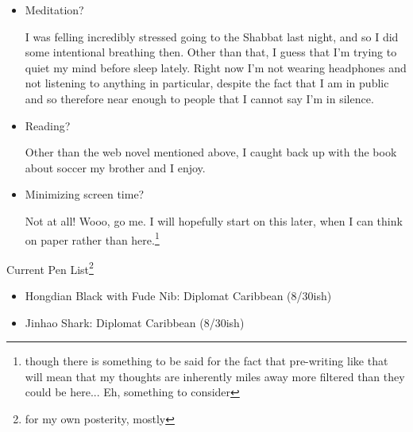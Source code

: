 \documentclass[12pt]{article}
\renewcommand{\,}{\textsuperscript{,}}
\begin{document}
\begin{itemize}
\item Meditation?

I was felling incredibly stressed going to the Shabbat last night, and so I did some intentional breathing then.  
Other than that, I guess that I'm trying to quiet my mind before sleep lately.  
Right now I'm not wearing headphones and not listening to anything in particular, despite the fact that I am in public and so therefore near enough to people that I cannot say I'm in silence.

\item Reading?

Other than the web novel mentioned above, I caught back up with the book about soccer my brother and I enjoy.

\item Minimizing screen time?

Not at all! Wooo, go me. I will hopefully start on this later, when I can think on paper rather than here.\footnote{though there is something to be said for the fact that pre-writing like that will mean that my thoughts are inherently miles away more filtered than they could be here... Eh, something to consider}

\end{itemize}

Current Pen List\footnote{for my own posterity, mostly}

\begin{itemize}  
\item Hongdian Black with Fude Nib: Diplomat Caribbean (8/30ish)  
\item Jinhao Shark: Diplomat Caribbean (8/30ish)

\end{itemize}
\end{document}
